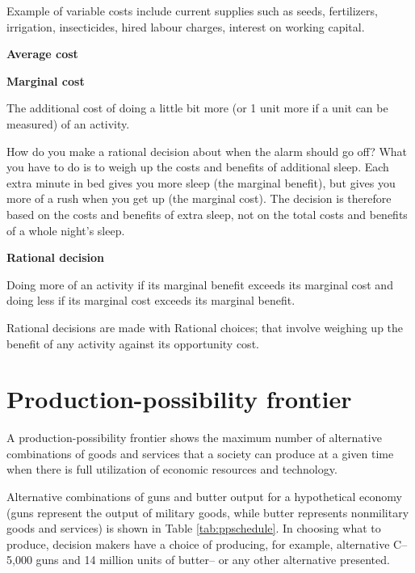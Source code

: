\documentclass[11pt,]{book}
\theoremstyle{definition}
\theoremstyle{definition}
\theoremstyle{definition}
\theoremstyle{remark}
\begin{document}
Example of variable costs include current supplies such as seeds,
fertilizers, irrigation, insecticides, hired labour charges, interest on
working capital.

\textbf{Average cost}

\textbf{Marginal cost}

The additional cost of doing a little bit more (or 1 unit more if a unit
can be measured) of an activity.

How do you make a rational decision about when the alarm should go off?
What you have to do is to weigh up the costs and benefits of additional
sleep. Each extra minute in bed gives you more sleep (the marginal
benefit), but gives you more of a rush when you get up (the marginal
cost). The decision is therefore based on the costs and benefits of
extra sleep, not on the total costs and benefits of a whole night's
sleep.

\textbf{Rational decision}

Doing more of an activity if its marginal benefit exceeds its marginal
cost and doing less if its marginal cost exceeds its marginal benefit.

Rational decisions are made with Rational choices; that involve weighing
up the benefit of any activity against its opportunity cost.

\section{Production-possibility
frontier}\label{production-possibility-frontier}

A production-possibility frontier shows the maximum number of
alternative combinations of goods and services that a society can
produce at a given time when there is full utilization of economic
resources and technology.

Alternative combinations of guns and butter output for a hypothetical
economy (guns represent the output of military goods, while butter
represents nonmilitary goods and services) is shown in Table
\ref{tab:ppschedule}. In choosing what to produce, decision makers have
a choice of producing, for example, alternative C-- 5,000 guns and 14
million units of butter-- or any other alternative presented.
\end{document}
